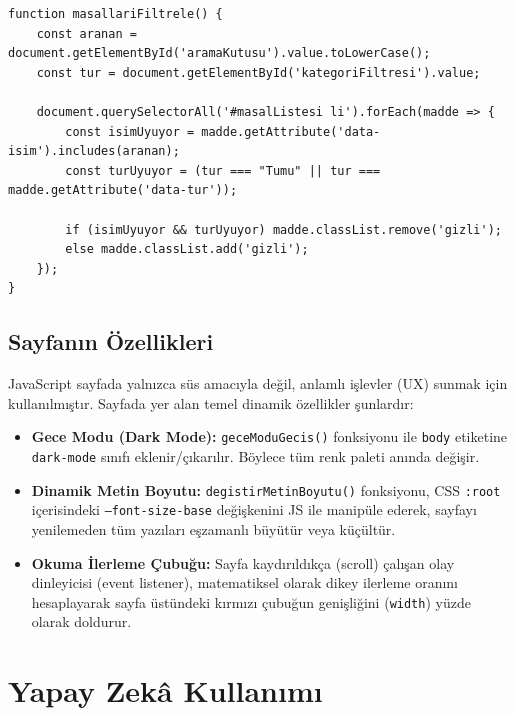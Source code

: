 \documentclass[12pt,a4paper]{article}
\begin{document}
\begin{lstlisting}[caption={Icsel JavaScript'ten onemli bir bolum}]
function masallariFiltrele() {
    const aranan = document.getElementById('aramaKutusu').value.toLowerCase();
    const tur = document.getElementById('kategoriFiltresi').value;
    
    document.querySelectorAll('#masalListesi li').forEach(madde => {
        const isimUyuyor = madde.getAttribute('data-isim').includes(aranan);
        const turUyuyor = (tur === "Tumu" || tur === madde.getAttribute('data-tur'));
        
        if (isimUyuyor && turUyuyor) madde.classList.remove('gizli');
        else madde.classList.add('gizli');
    });
}
\end{lstlisting}

\subsection{Sayfanın Özellikleri}
JavaScript sayfada yalnızca süs amacıyla değil, anlamlı işlevler (UX) sunmak için kullanılmıştır. Sayfada yer alan temel dinamik özellikler şunlardır:
\begin{itemize}
    \item \textbf{Gece Modu (Dark Mode):} \texttt{geceModuGecis()} fonksiyonu ile \texttt{body} etiketine \texttt{dark-mode} sınıfı eklenir/çıkarılır. Böylece tüm renk paleti anında değişir.
    \item \textbf{Dinamik Metin Boyutu:} \texttt{degistirMetinBoyutu()} fonksiyonu, CSS \texttt{:root} içerisindeki \texttt{--font-size-base} değişkenini JS ile manipüle ederek, sayfayı yenilemeden tüm yazıları eşzamanlı büyütür veya küçültür.
    \item \textbf{Okuma İlerleme Çubuğu:} Sayfa kaydırıldıkça (scroll) çalışan olay dinleyicisi (event listener), matematiksel olarak dikey ilerleme oranını hesaplayarak sayfa üstündeki kırmızı çubuğun genişliğini (\texttt{width}) yüzde olarak doldurur.
\end{itemize}

\section{Yapay Zekâ Kullanımı}
\end{document}
